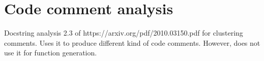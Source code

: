 



\section{Code comment analysis}
\label{sec:code-comment-analysis}
Docstring analysis 2.3 of https://arxiv.org/pdf/2010.03150.pdf for clustering comments. Uses it to produce different kind of code comments. However, does not use it for function generation. 





